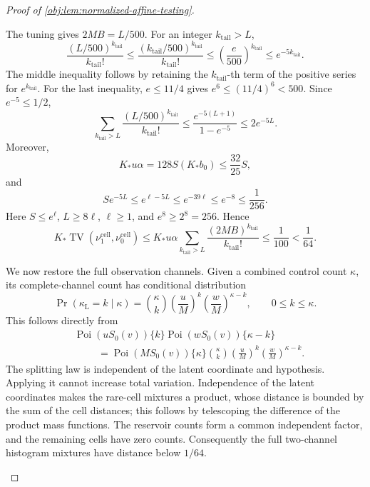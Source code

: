 \documentclass[11pt]{article}
\begin{document}
\begin{proof}[Proof of \cref{obj:lem:normalized-affine-testing}]
\begin{enumerate}
The tuning gives \(2MB=L/500\). For an integer \(k_{\mathrm{tail}}>L\),
\[
\frac{(L/500)^{k_{\mathrm{tail}}}}{k_{\mathrm{tail}}!}
\le\frac{(k_{\mathrm{tail}}/500)^{k_{\mathrm{tail}}}}{k_{\mathrm{tail}}!}
\le\left(\frac{e}{500}\right)^{k_{\mathrm{tail}}}
\le e^{-5k_{\mathrm{tail}}}.
\]
The middle inequality follows by retaining the \(k_{\mathrm{tail}}\)-th term of the positive series for \(e^{k_{\mathrm{tail}}}\). For the last inequality, \(e\le11/4\) gives
\(e^6\le(11/4)^6<500\). Since \(e^{-5}\le1/2\),
\[
\sum_{k_{\mathrm{tail}}>L}\frac{(L/500)^{k_{\mathrm{tail}}}}{k_{\mathrm{tail}}!}
\le\frac{e^{-5(L+1)}}{1-e^{-5}}
\le2e^{-5L}.
\]
Moreover,
\[
K_*u\alpha=128S(K_*b_0)\le\frac{32}{25}S,
\]
and
\[
Se^{-5L}
\le e^{\ell-5L}
\le e^{-39\ell}
\le e^{-8}\le\frac1{256}.
\]
Here \(S\le e^\ell\), \(L\ge8\ell\), \(\ell\ge1\), and
\(e^8\ge2^8=256\). Hence
\[
K_*\operatorname{TV}(\nu_1^{\mathrm{cell}},\nu_0^{\mathrm{cell}})
\le K_*u\alpha\sum_{k_{\mathrm{tail}}>L}\frac{(2MB)^{k_{\mathrm{tail}}}}{k_{\mathrm{tail}}!}
\le\frac1{100}<\frac1{64}.
\]

We now restore the full observation channels. Given a combined control count \(\kappa\), its complete-channel count has conditional distribution
\[
\Pr(\kappa_{\mathrm L}=k\mid\kappa)
=\binom{\kappa}{k}\left(\frac uM\right)^k
                    \left(\frac wM\right)^{\kappa-k},
\qquad 0\le k\le\kappa.
\]
This follows directly from
\[
\begin{aligned}
&\operatorname{Poi}(uS_0(v))\{k\}
 \operatorname{Poi}(wS_0(v))\{\kappa-k\}\\
&\hspace{1cm}=
\operatorname{Poi}(MS_0(v))\{\kappa\}
\binom{\kappa}{k}\left(\frac uM\right)^k
                    \left(\frac wM\right)^{\kappa-k}.
\end{aligned}
\]
The splitting law is independent of the latent coordinate and hypothesis. Applying it cannot increase total variation. Independence of the latent coordinates makes the rare-cell mixtures a product, whose distance is bounded by the sum of the cell distances; this follows by telescoping the difference of the product mass functions. The reservoir counts form a common independent factor, and the remaining cells have zero counts. Consequently the full two-channel histogram mixtures have distance below \(1/64\).


\end{enumerate}
\end{proof}
\end{document}
